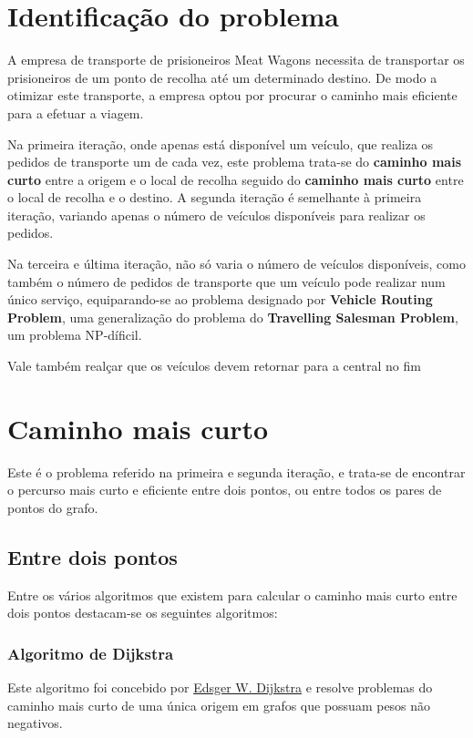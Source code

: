 \documentclass[article, a4paper, 12pt, oneside]{memoir}
\begin{document}
\section{Identificação do problema}

A empresa de transporte de prisioneiros Meat Wagons necessita de transportar os prisioneiros  de um ponto de recolha até um determinado destino. De modo a otimizar este transporte, a empresa optou por procurar o caminho mais eficiente para a efetuar a viagem. 

Na primeira iteração, onde apenas está disponível um veículo, que realiza os pedidos de transporte um de cada vez, este problema trata-se do \textbf{caminho mais curto} entre a origem e o local de recolha seguido do \textbf{caminho mais curto} entre o local de recolha e o destino. A segunda iteração é semelhante à primeira iteração, variando apenas o número de veículos disponíveis para realizar os pedidos.

Na terceira e última iteração, não só varia o número de veículos disponíveis, como também o número de pedidos de transporte que um veículo pode realizar num único serviço, equiparando-se ao problema designado por \textbf{Vehicle Routing Problem}, uma generalização do problema do \textbf{Travelling Salesman Problem}, um problema NP-díficil.

Vale também realçar que os veículos devem retornar para a central no fim 

\section{Caminho mais curto}
Este é o problema referido na primeira e segunda iteração, e trata-se de encontrar o percurso mais curto e eficiente entre dois pontos, ou entre todos os pares de pontos do grafo.

\subsection{Entre dois pontos}
Entre os vários algoritmos que existem para calcular o caminho mais curto entre dois pontos destacam-se os seguintes algoritmos:

\subsubsection{Algoritmo de Dijkstra}
Este algoritmo foi concebido por \href{https://en.wikipedia.org/wiki/Edsger_W._Dijkstra}{Edsger W. Dijkstra} e resolve problemas do caminho mais curto de uma única origem em grafos que possuam pesos não negativos.
\end{document}
